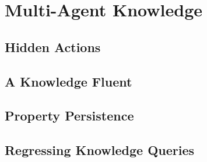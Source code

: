 \chapter{Multi-Agent Knowledge}\label{ch:knowledge}
\minitoc
\onehalfspace   %

\section{Hidden Actions}

\section{A Knowledge Fluent}
\cite{kelly07sc_know_obs}

\section{Property Persistence}
\cite{kelly07sc_persistence}

\section{Regressing Knowledge Queries}



